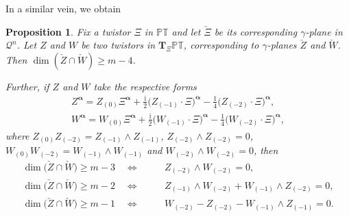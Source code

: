 \documentclass[pdftex]{sigma}
\numberwithin{equation}{section}
\newtheorem{Proposition}[Theorem]{Proposition}
 { \theoremstyle{definition}
\newtheorem{Definition}[Theorem]{Definition}
\newtheorem{Example}[Theorem]{Example}
\newtheorem{Remark}[Theorem]{Remark} }
\newcommand{\mbf} [1]{\mathbf{#1}}
\newcommand{\mc} [1]{\mathcal{#1}}
\newcommand{\ii} {\mathrm{i}}
\newcommand{\PT} {\mathbb{PT}}
\begin{document}
In a similar vein, we obtain
\begin{Proposition}\label{prop-geometric-T}
Fix a twistor $\Xi$ in $\PT$ and let $\check{\Xi }$ be its corresponding $\gamma$-plane in $\mc{Q}^n$. Let $Z$ and $W$ be two twistors in $\mbf{T}_\Xi \PT$, corresponding to $\gamma$-planes $\check{Z}$ and $\check{W}$. Then $\dim ( \check{Z} \cap \check{W} ) \geq m-4$.

Further, if $Z$ and $W$ take the respective forms
\begin{gather*}%
Z^{\bm{\upalpha}} = Z_{(0)} \Xi^{\bm{\upalpha}} + \tfrac{\ii}{2} \big( Z_{(-1)} \cdot \Xi \big)^{\bm{\upalpha}} - \tfrac{1}{4} \big( Z_{(-2)} \cdot \Xi\big)^{\bm{\upalpha}} , \\
W^{\bm{\upalpha}} = W_{(0)} \Xi^{\bm{\upalpha}} + \tfrac{\ii}{2} \big( W_{(-1)} \cdot \Xi \big)^{\bm{\upalpha}} - \tfrac{1}{4} \big( W_{(-2)} \cdot \Xi\big)^{\bm{\upalpha}} ,
\end{gather*}
where $Z_{(0)} Z_{(-2)} = Z_{(-1)} \wedge Z_{(-1)}$, $Z_{(-2)} \wedge Z_{(-2)} = 0$, $W_{(0)} W_{(-2)} = W_{(-1)} \wedge W_{(-1)}$ and $W_{(-2)} \wedge W_{(-2)} = 0$, then
\begin{subequations}
\begin{alignat}{3}
& \dim \big( \check{Z} \cap \check{W} \big) \geq m-3 \quad \Longleftrightarrow \quad & & Z_{(-2)} \wedge W_{(-2)} = 0 ,& \label{eq-inter3} \\
& \dim \big( \check{Z} \cap \check{W} \big) \geq m-2 \quad \Longleftrightarrow \quad & & Z_{(-1)} \wedge W_{(-2)} + W_{(-1)} \wedge Z_{(-2)} = 0 , & \label{eq-inter2} \\
& \dim \big( \check{Z} \cap \check{W} \big) \geq m-1\quad \Longleftrightarrow \quad & & W_{(-2)} - Z_{(-2)} - W_{(-1)} \wedge Z_{(-1)} = 0 . & \label{eq-inter1}
\end{alignat}
\end{subequations}
\end{Proposition}
\end{document}
